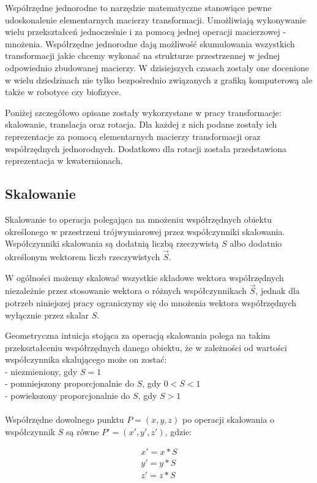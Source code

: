 \documentclass[licencjacka]{pracamgr}
\begin{document}
Współrzędne jednorodne to narzędzie matematyczne stanowiące pewne udoskonalenie elementarnych macierzy transformacji. Umożliwiają wykonywanie wielu przekształceń jednocześnie i za pomocą jednej operacji macierzowej - mnożenia. Współrzędne jednorodne dają możliwość skumulowania wszystkich transformacji jakie chcemy wykonać na strukturze przestrzennej w jednej odpowiednio zbudowanej macierzy. W dzisiejszych czasach zostały one docenione w wielu dziedzinach nie tylko bezpośrednio związanych z grafiką komputerową ale także w robotyce czy biofizyce.

Poniżej szczegółowo opisane zostały wykorzystane w pracy transformacje: skalowanie, translacja oraz rotacja. Dla każdej z nich podane zostały ich reprezentacje za pomocą elementarnych macierzy transformacji oraz współrzędnych jednorodnych. Dodatkowo dla rotacji została przedstawiona reprezentacja w kwaternionach.

\subsection{Skalowanie}
Skalowanie to operacja polegająca na mnożeniu współrzędnych obiektu określonego w przestrzeni trójwymiarowej przez współczynniki skalowania. Współczynniki skalowania są dodatnią liczbą rzeczywistą $S$ albo dodatnio określonym wektorem liczb rzeczywistych $\vec{S}$. 

W ogólności możemy skalować wszystkie składowe wektora współrzędnych niezależnie przez stosowanie wektora o różnych współczynnikach $\vec{S}$, jednak dla potrzeb niniejszej pracy ograniczymy się do mnożenia wektora współrzędnych wyłącznie przez skalar $S$.

Geometryczna intuicja stojąca za operacją skalowania polega na takim przekształceniu współrzędnych danego obiektu, że w zależności od wartości współczynnika skalującego może on zostać: 
\\
- niezmieniony, gdy $S=1$
\\
- pomniejszony proporcjonalnie do $S$, gdy $0<S<1$
\\
- powiekszony proporcjonalnie do $S$, gdy $S>1$
\\
\\
Współrzędne dowolnego punktu $P=(x,y,z)$ po operacji skalowania o współczynnik $S$ są równe $P'=(x',y',z')$, gdzie:

$$
\begin{array}{lr}
x'=x*S \\
y'=y*S \\
z'=z*S
\end{array}
$$
\end{document}
